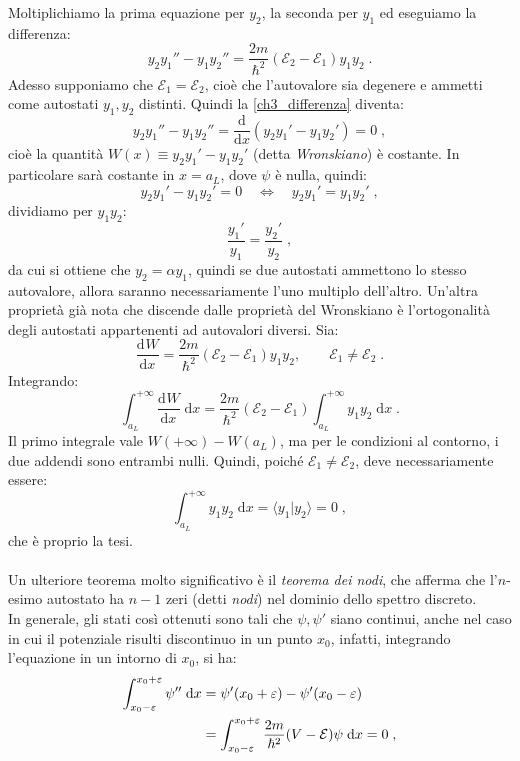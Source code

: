 \documentclass[12pt,a4paper]{report}
\theoremstyle{definition}
\newcommand{\dev}[3][]{\frac{\mathrm{d}^{#1} #2}{\mathrm{d} #3^{#1}}}
\numberwithin{equation}{section}
\newcommand{\diff}[1][]{\mathrm{d}#1}
\newcommand{\bra}{\langle}
\newcommand{\ket}{\rangle}
\begin{document}
Moltiplichiamo la prima equazione per $y_2$, la seconda per $y_1$ ed eseguiamo la differenza:
\begin{equation}
y_2y_1''-y_1y_2''=\frac{2m}{\hbar^2}(\mathcal{E}_2-\mathcal{E}_1)y_1y_2\;. \label{ch3_differenza}
\end{equation}
Adesso supponiamo che $\mathcal{E}_1=\mathcal{E}_2$, cioè che l'autovalore sia degenere e ammetti come autostati $y_1,y_2$ distinti. Quindi la \eqref{ch3_differenza} diventa:
\begin{equation}
y_2y_1''-y_1y_2''=\frac{\mathrm{d}}{\diff{x}}(y_2y_1'-y_1y_2')=0\;,
\end{equation}
cioè la quantità $W(x)\equiv y_2y_1'-y_1y_2'$ (detta \textit{Wronskiano}) è costante. In particolare sarà costante in $x=a_L$, dove $\psi$ è nulla, quindi:
$$
y_2y_1'-y_1y_2'=0\quad \Longleftrightarrow \quad y_2y_1'=y_1y_2'\;,
$$
dividiamo per $y_1y_2$:
$$
\frac{y_1'}{y_1}=\frac{y_2'}{y_2}\;,
$$
da cui si ottiene che $y_2=\alpha y_1$, quindi se due autostati ammettono lo stesso autovalore, allora saranno necessariamente l'uno multiplo dell'altro. Un'altra proprietà già nota che discende dalle proprietà del Wronskiano è l'ortogonalità degli autostati appartenenti ad autovalori diversi. Sia:
$$
\dev{W}{x}=\frac{2m}{\hbar^2}(\mathcal{E}_2-\mathcal{E}_1)y_1y_2,\qquad \mathcal{E}_1\ne\mathcal{E}_2\;.
$$
Integrando:
\begin{equation}
\int_{a_L}^{+\infty}\dev{W}{x}\;\diff{x}=\frac{2m}{\hbar^2}(\mathcal{E}_2-\mathcal{E}_1)\int_{a_L}^{+\infty} y_1y_2\;\diff{x}\;.
\end{equation}
Il primo integrale vale $W(+\infty)-W(a_L)$, ma per le condizioni al contorno, i due addendi sono entrambi nulli. Quindi, poiché $\mathcal{E}_1\ne\mathcal{E}_2$, deve necessariamente essere:
\begin{equation}
\int_{a_L}^{+\infty} y_1y_2\;\diff{x}=\bra y_1|y_2\ket=0\;,
\end{equation}
che è proprio la tesi. \\
\\
Un ulteriore teorema molto significativo è il \textit{teorema dei nodi}, che afferma che l'$n$-esimo autostato ha $n-1$ zeri (detti \textit{nodi}) nel dominio dello spettro discreto. \\
In generale, gli stati così ottenuti sono tali che $\psi,\psi'$ siano continui, anche nel caso in cui il potenziale risulti discontinuo in un punto $x_0$, infatti, integrando l'equazione in un intorno di $x_0$, si ha:
\begin{align}
\int_{x_0-\varepsilon}^{x_0+\varepsilon} \psi''\;\diff{x} &= \psi'(x_0+\varepsilon)-\psi'(x_0-\varepsilon) \notag \\
&= \int_{x_0-\varepsilon}^{x_0+\varepsilon} \frac{2m}{\hbar^2}(V-\mathcal{E})\psi\;\diff{x}=0\;,
\end{align}
\end{document}
